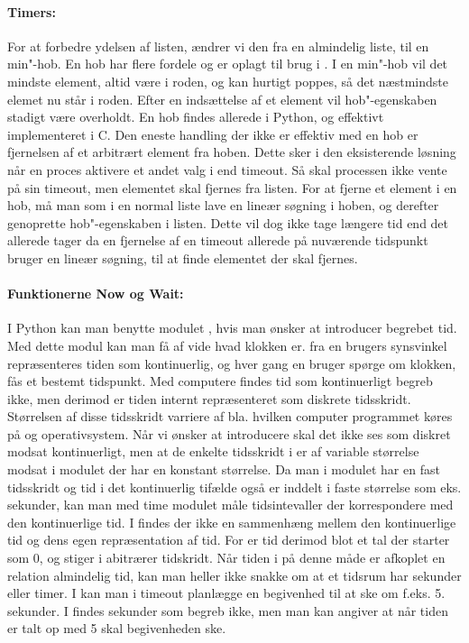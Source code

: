 \paragraph*{Timers:} For at forbedre ydelsen af  listen, ændrer vi den fra en almindelig liste, til en min"-hob. En hob har flere fordele og er oplagt til brug i \sched. I en min"-hob vil det mindste element, altid være i roden, og kan hurtigt poppes, så det næstmindste elemet nu står i roden. Efter en indsættelse af et element vil hob"-egenskaben stadigt være overholdt. En hob findes allerede i Python, og effektivt implementeret i C. Den eneste handling der ikke er effektiv med en hob er fjernelsen af et arbitrært element fra hoben. Dette sker i den eksisterende løsning når en proces aktivere et andet valg i  end timeout. Så skal processen ikke vente på sin timeout, men elementet skal fjernes fra  listen.  For at fjerne et element i en hob, må man som i en normal liste lave en lineær søgning i hoben, og derefter genoprette hob"-egenskaben i listen. Dette vil dog ikke tage længere tid end det allerede tager da en fjernelse af en timeout allerede på nuværende tidspunkt bruger en lineær søgning, til at finde elementet der skal fjernes. 


\paragraph*{Funktionerne Now og Wait:}
I Python kan man benytte modulet , hvis man ønsker at introducer begrebet tid. Med dette modul kan man få af vide hvad klokken er. fra en brugers synsvinkel repræsenteres tiden som kontinuerlig, og hver gang en bruger spørge om klokken, fås et bestemt tidspunkt. Med computere findes tid som kontinuerligt begreb ikke, men derimod er tiden internt repræsenteret som diskrete tidsskridt. Størrelsen af disse tidsskridt varriere af bla. hvilken computer programmet køres på og operativsystem. Når vi ønsker at introducere \des skal det ikke ses som diskret modsat kontinuerligt, men at de enkelte tidsskridt i \des er af variable størrelse modsat i modulet  der har en konstant størrelse.  Da man i  modulet har en fast tidsskridt og tid i det kontinuerlig tifælde også er inddelt i faste størrelse som eks. sekunder, kan man med time modulet måle tidsintevaller der korrespondere med den kontinuerlige tid. I \des findes der ikke en sammenhæng mellem den kontinuerlige tid og dens egen repræsentation af tid. For \des er tid derimod blot et tal der starter som 0, og stiger i abitrærer tidskridt. Når tiden i \des på denne måde er afkoplet en relation almindelig tid, kan man heller ikke snakke om at et tidsrum har sekunder eller timer. I \pycsp kan man i timeout planlægge en begivenhed til at ske om f.eks. 5. sekunder. I \des findes sekunder som begreb ikke, men man kan angiver at når tiden er talt op med 5 skal begivenheden ske.  

